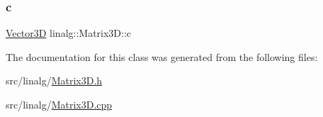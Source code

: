 \subsubsection{\texorpdfstring{c}{c}}
{\footnotesize\ttfamily \mbox{\hyperlink{classVector3D}{Vector3D}} linalg\+::\+Matrix3\+D\+::c\hspace{0.3cm}{\ttfamily [private]}}



The documentation for this class was generated from the following files\+:\begin{DoxyCompactItemize}
\item 
src/linalg/\mbox{\hyperlink{Matrix3D_8h}{Matrix3\+D.\+h}}\item 
src/linalg/\mbox{\hyperlink{Matrix3D_8cpp}{Matrix3\+D.\+cpp}}\end{DoxyCompactItemize}
